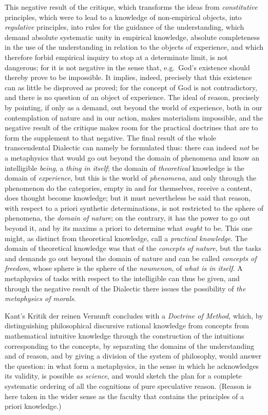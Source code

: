 This negative result of the critique, which transforms the ideas from
\emph{constitutive} principles, which were to lead to a knowledge of
non-empirical objects, into \emph{regulative} principles, into rules for
the guidance of the understanding, which demand absolute systematic unity
in empirical knowledge, absolute completeness in the use of
the understanding in relation to the objects of experience, and which
therefore forbid empirical inquiry to stop at a determinate limit, is not
dangerous; for it is not negative in the sense that, e.g.\ God's
existence should thereby prove to be impossible. It implies, indeed,
precisely that this existence can as little be disproved as proved; for
the concept of God is not contradictory, and there is no question of an
object of experience. The ideal of reason, precisely by pointing, if only
as a demand, out beyond the world of experience, both in our
contemplation of nature and in our action, makes materialism impossible,
and the negative result of the critique makes room for the practical
doctrines that are to form the supplement to that negative. The final
result of the whole transcendental Dialectic can namely be formulated
thus: there can indeed \emph{not} be a metaphysics that would go out
beyond the domain of phenomena and know an intelligible \emph{being}, a
\emph{thing in itself}; the domain of \emph{theoretical} knowledge is the
domain of \emph{experience}, but this is the world of \emph{phenomena},
and only through the phenomenon do the categories, empty in and for
themselves, receive a content, does thought become knowledge; but it must
nevertheless be said that reason, with respect to a priori synthetic
determinations, is not restricted to the sphere of phenomena, the
\emph{domain of nature}; on the contrary, it has the power to go out
beyond it, and by its maxims a priori to determine what \emph{ought} to
be. This one might, as distinct from theoretical knowledge, call a
\emph{practical knowledge}. The domain of theoretical knowledge was that
of the \emph{concepts of nature}, but the tasks and demands go out beyond
the domain of nature and can be called \emph{concepts of freedom}, whose
sphere is the sphere of the \emph{noumenon}, of \emph{what is in itself}.
A metaphysics of tasks with respect to the intelligible can thus be
given, and through the negative result of the Dialectic there issues the
possibility of \emph{the metaphysics of morals}.

\divrule

Kant's Kritik der reinen Vernunft concludes with a \emph{Doctrine
of Method}, which, by distinguishing philosophical discursive rational
knowledge from concepts from mathematical intuitive knowledge through the
construction of the intuitions corresponding to the concepts, by
separating the domains of the understanding and of reason, and by giving
a division of the system of philosophy, would answer the question: in
what form a metaphysics, in the sense in which he acknowledges its
validity, is possible \emph{as science}, and would sketch the plan for a
complete systematic ordering of all the cognitions of pure speculative
reason. (Reason is here taken in the wider sense as the faculty that
contains the principles of a priori knowledge.)


